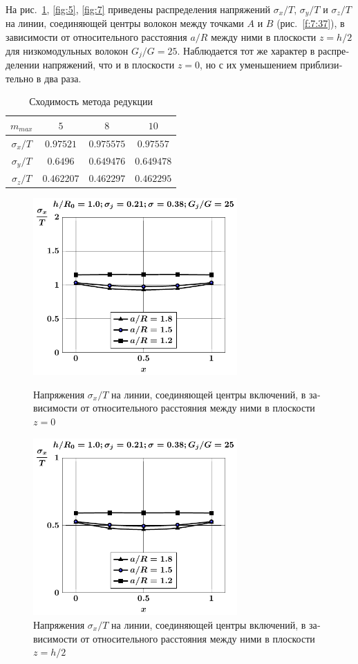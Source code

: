\begin{russian}
{На рис.~\ref{fig:3}, \ref{fig:5}, \ref{fig:7} приведены распределения напряжений $\sigma_x/T$, $\sigma_y/T$ и $\sigma_z/T$ на линии, соединяющей центры волокон между точками $A$ и $B$ (рис.~\ref{f:7:37}), в зависимости от относительного расстояния $a/R$ между ними в плоскости $z=h/2$ для низкомодульных волокон $G_j/G=25$. 
Наблюдается тот же} характер в распределении напряжений, что и в плоскости $z=0$, но с их уменьшением приблизительно в два раза.

\begin{table}[h!]
\centering
\caption{Сходимость метода редукции}
\label{tab:1}
\begin{tabular}{|c|c|c|c|}
\hline
$m_{max}$ & $5$ & $8$ & $10$ \\
\hline
$\sigma_x/T$ & $0.97521$ & $0.975575$ & $0.97557$ \\
\hline
$\sigma_y/T$ & $0.6496$ & $0.649476$ & $0.649478$ \\
\hline
$\sigma_z/T$ & $0.462207$ & $0.462297$ & $0.462295$ \\
\hline
\end{tabular}
\end{table}

\begin{figure}[h!]
\centering\footnotesize
\parbox[b]{7.5cm}{\centering\includegraphics[width=7.8cm]{inc16-a-h10-r10-g25-z0-sig-x.pdf}
\caption{Напряжения $\sigma_x/T$ на линии, соединяющей центры включений, в зависимости от относительного расстояния между ними в плоскости $z=0$
\label{fig:2}}}\hfil\hfil
\parbox[b]{7.5cm}{\centering\includegraphics[width=7.8cm]{inc16-a-h10-r10-g25-z1-sig-x.pdf}
\caption{Напряжения $\sigma_x/T$ на линии, соединяющей центры включений, в зависимости от относительного расстояния между ними в плоскости $z=h/2$
\label{fig:3}
}}
\end{figure}


\end{russian}
